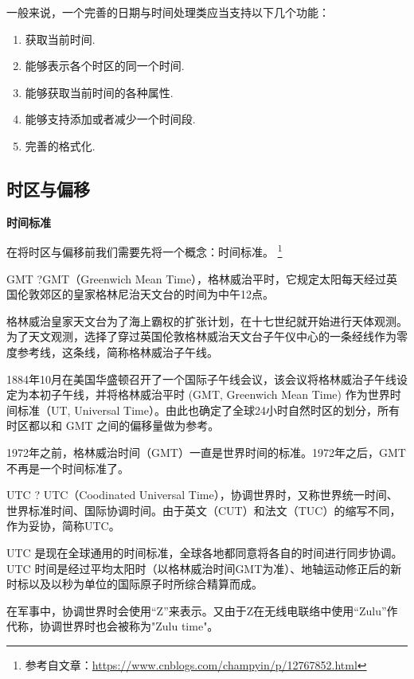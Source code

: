 \documentclass[cn,10pt,math=newtx,citestyle=gb7714-2015,bibstyle=gb7714-2015]{elegantbook}
\begin{document}
    一般来说，一个完善的日期与时间处理类应当支持以下几个功能：

    \begin{enumerate}
        \item 获取当前时间.
        \item 能够表示各个时区的同一个时间.
        \item 能够获取当前时间的各种属性.
        \item 能够支持添加或者减少一个时间段.
        \item 完善的格式化.
    \end{enumerate}

    \subsection{时区与偏移}

    \textbf{时间标准}

    在将时区与偏移前我们需要先将一个概念：时间标准。
    \footnote{
        参考自文章：\url{https://www.cnblogs.com/champyin/p/12767852.html}
    }

    \begin{definition}{GMT}
        ?GMT（Greenwich Mean Time），格林威治平时，它规定太阳每天经过英国伦敦郊区的皇家格林尼治天文台的时间为中午12点。

        格林威治皇家天文台为了海上霸权的扩张计划，在十七世纪就开始进行天体观测。为了天文观测，选择了穿过英国伦敦格林威治天文台子午仪中心的一条经线作为零度参考线，这条线，简称格林威治子午线。

        1884年10月在美国华盛顿召开了一个国际子午线会议，该会议将格林威治子午线设定为本初子午线，并将格林威治平时 (GMT, Greenwich Mean Time) 作为世界时间标准（UT, Universal Time）。由此也确定了全球24小时自然时区的划分，所有时区都以和 GMT 之间的偏移量做为参考。

        1972年之前，格林威治时间（GMT）一直是世界时间的标准。1972年之后，GMT 不再是一个时间标准了。

        
    \end{definition}

    \begin{definition}{UTC}
        ? UTC（Coodinated Universal Time），协调世界时，又称世界统一时间、世界标准时间、国际协调时间。由于英文（CUT）和法文（TUC）的缩写不同，作为妥协，简称UTC。

        UTC 是现在全球通用的时间标准，全球各地都同意将各自的时间进行同步协调。UTC 时间是经过平均太阳时（以格林威治时间GMT为准）、地轴运动修正后的新时标以及以秒为单位的国际原子时所综合精算而成。

        在军事中，协调世界时会使用“Z”来表示。又由于Z在无线电联络中使用“Zulu”作代称，协调世界时也会被称为"Zulu time"。
    \end{definition}
\end{document}
